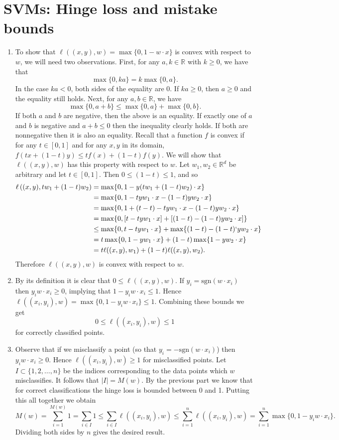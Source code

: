 \documentclass{article}
\newcommand{\R}{\mathbb{R}}
\begin{document}

\section{SVMs: Hinge loss and mistake bounds}
\begin{enumerate}
	\item To show that $\ell((x,y),w)=\max\{0,1-w\cdot x\}$ is convex with respect to $w$, we will need two observations. First, for any $a,k\in\R$ with $k\geq 0$, we have that
	\[
		\max\{0,ka\} = k\max\{0,a\}.
	\]
	In the case $ka<0$, both sides of the equality are 0. If $ka\geq 0$, then $a\geq0$ and the equality still holds. Next, for any $a,b\in\R$, we have
	\[
		\max\{0,a+b\}\leq \max\{0,a\}+\max\{0,b\}.
	\]
	If both $a$ and $b$ are negative, then the above is an equality. If exactly one of $a$ and $b$ is negative and $a+b\leq0$ then the inequality clearly holds. If both are nonnegative then it is also an equality.
	\vskip 0.1cm
	Recall that a function $f$ is convex if for any $t\in[0,1]$ and for any $x,y$ in its domain, $f(tx+(1-t)y)\leq tf(x)+(1-t)f(y)$. We will show that $\ell((x,y),w)$ has this property with respect to $w$. Let $w_1,w_2\in\R^d$ be arbitrary and let $t\in[0,1]$. Then $0\leq(1-t)\leq1$, and so
	\begin{align*}
		\ell\left((x,y),tw_1+(1-t)w_2\right) &= \max\{0,1-y(tw_1+(1-t)w_2)\cdot x\}\\
		&= \max\{0,1-tyw_1\cdot x-(1-t)yw_2\cdot x \}\\
		&= \max\{0,1+(t-t)-tyw_1\cdot x-(1-t)yw_2\cdot x \}\\
		&= \max\{0,[t-tyw_1\cdot x] + [(1-t)-(1-t)yw_2\cdot x] \}\\
		&\leq \max\{0,t-tyw_1\cdot x\}+\max\{(1-t)-(1-t)`yw_2\cdot x \}\\
		&= t\max\{0,1-yw_1\cdot x\}+(1-t)\max\{1-yw_2\cdot x \}\\
		&= t\ell((x,y),w_1)+(1-t)\ell((x,y),w_2).
	\end{align*}
	Therefore $\ell((x,y),w)$ is convex with respect to $w$.
	\item By its definition it is clear that $0\leq\ell((x,y),w)$. If $y_i=\mathrm{sgn}(w\cdot x_i)$ then $y_iw\cdot x_i\geq 0$, implying that $1- y_iw\cdot x_i\leq 1$. Hence $\ell((x_i,y_i),w)=\max\{0,1-y_iw\cdot x_i\}\leq 1$. Combining these bounds we get
	\[
		0\leq \ell((x_i,y_i),w)\leq 1
	\]
	for correctly classified points.
	\item Observe that if we misclassify a point (so that $y_i=-\mathrm{sgn}(w\cdot x_i)$) then $y_iw\cdot x_i\geq0$. Hence $\ell((x_i,y_i),w)\geq 1$ for misclassified points. Let $I\subset \{1,2,\dots,n\}$ be the indices corresponding to the data points which $w$ misclassifies. It follows that $|I|=M(w)$. By the previous part we know that for correct classifications the hinge loss is bounded between 0 and 1. Putting this all together we obtain
	\[
		M(w) = \sum_{i=1}^{M(w)}1 = \sum_{i\in I}1 \leq \sum_{i\in I}\ell((x_i,y_i),w)\leq\sum^n_{i=1}\ell((x_i,y_i),w)= \sum^n_{i=1}\max\{0,1-y_iw\cdot x_i\}.
	\]
	Dividing both sides by $n$ gives the desired result.
\end{enumerate}
\end{document}
